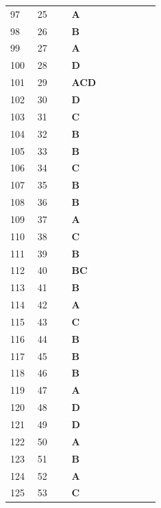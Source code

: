 \documentclass[UTF8,fontset=windows,11pt]{ctexart}
\begin{document}
\begin{longtable}{p{0.16\linewidth}p{0.2\linewidth}p{0.52\linewidth}}
97 & 25 & \textbf{\textcolor{answergreen}{A}} \\
98 & 26 & \textbf{\textcolor{answergreen}{B}} \\
99 & 27 & \textbf{\textcolor{answergreen}{A}} \\
100 & 28 & \textbf{\textcolor{answergreen}{D}} \\
101 & 29 & \textbf{\textcolor{answergreen}{ACD}} \\
102 & 30 & \textbf{\textcolor{answergreen}{D}} \\
103 & 31 & \textbf{\textcolor{answergreen}{C}} \\
104 & 32 & \textbf{\textcolor{answergreen}{B}} \\
105 & 33 & \textbf{\textcolor{answergreen}{B}} \\
106 & 34 & \textbf{\textcolor{answergreen}{C}} \\
107 & 35 & \textbf{\textcolor{answergreen}{B}} \\
108 & 36 & \textbf{\textcolor{answergreen}{B}} \\
109 & 37 & \textbf{\textcolor{answergreen}{A}} \\
110 & 38 & \textbf{\textcolor{answergreen}{C}} \\
111 & 39 & \textbf{\textcolor{answergreen}{B}} \\
112 & 40 & \textbf{\textcolor{answergreen}{BC}} \\
113 & 41 & \textbf{\textcolor{answergreen}{B}} \\
114 & 42 & \textbf{\textcolor{answergreen}{A}} \\
115 & 43 & \textbf{\textcolor{answergreen}{C}} \\
116 & 44 & \textbf{\textcolor{answergreen}{B}} \\
117 & 45 & \textbf{\textcolor{answergreen}{B}} \\
118 & 46 & \textbf{\textcolor{answergreen}{B}} \\
119 & 47 & \textbf{\textcolor{answergreen}{A}} \\
120 & 48 & \textbf{\textcolor{answergreen}{D}} \\
121 & 49 & \textbf{\textcolor{answergreen}{D}} \\
122 & 50 & \textbf{\textcolor{answergreen}{A}} \\
123 & 51 & \textbf{\textcolor{answergreen}{B}} \\
124 & 52 & \textbf{\textcolor{answergreen}{A}} \\
125 & 53 & \textbf{\textcolor{answergreen}{C}} \\

\end{longtable}
\end{document}
